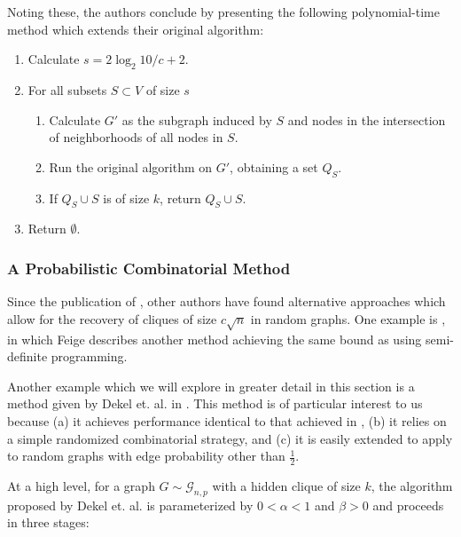 \documentclass{article}
\theoremstyle{definition}
\begin{document}
\noindent Noting these, the authors conclude by presenting the following 
polynomial-time method which extends their original algorithm:

\begin{enumerate}
\item{Calculate $s = 2\log_2{10/c} + 2$.}
\item{For all subsets $S \subset V$ of size $s$}
\begin{enumerate}
\item{Calculate $G'$ as the subgraph induced by $S$ and nodes in the intersection 
of neighborhoods of all nodes in $S$.}
\item{Run the original algorithm on $G'$, obtaining a set $Q_S$.}
\item{If $Q_S \cup S$ is of size $k$, return $Q_S \cup S$.}
\end{enumerate}
\item{Return $\emptyset$.}
\end{enumerate}

\subsubsection{A Probabilistic Combinatorial Method}

Since the publication of \cite{Spectral}, other authors have found alternative
approaches which allow for the recovery of cliques of size $c\sqrt{n}$ in 
random graphs.  One example is \cite{SDP}, in which Feige describes another 
method achieving the same bound as \cite{Spectral} using semi-definite programming.

Another example which we will explore in greater detail in this section is 
a method given by  Dekel et. al. in \cite{Combinatoric}.  This method is of particular interest to us because (a) it achieves performance identical 
to that achieved in \cite{Spectral}, (b) it relies on a simple 
randomized combinatorial strategy, and (c) it is easily extended to apply 
to random graphs with edge probability other than $\frac{1}{2}$.

At a high level, for a graph $G \sim \mathcal{G}_{n,p}$ with a hidden 
clique of size $k$, the algorithm proposed by Dekel et. al. is parameterized
by $0 < \alpha < 1$ and $\beta > 0$ and proceeds in three stages:
\end{document}
